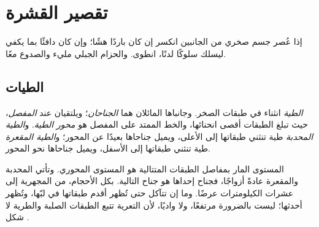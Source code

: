 \section{تقصير القشرة}

إذا عُصر جسم صخري من الجانبين انكسر إن كان باردًا هشًا؛ وإن
كان دافئًا بما يكفي ليسلك سلوكًا لدنًا، انطوى. والحزام الجبلي
مليء  والصدوع معًا.

\subsection{الطيات}

\begin{definition}\label{def:g12:mountain-building:fold}
\emph{الطية} انثناء في طبقات الصخر. وجانباها المائلان
هما \emph{الجناحان}؛ ويلتقيان عند \emph{المفصل}، حيث تبلغ الطبقات أقصى
انحنائها، والخط الممتد على المفصل هو
\emph{محور الطية}. و\emph{الطية المحدبة} طية تنثني طبقاتها
إلى الأعلى، ويميل جناحاها بعيدًا عن المحور؛
و\emph{الطية المقعرة} طية تنثني طبقاتها إلى الأسفل، ويميل
جناحاها نحو المحور.
\end{definition}

المستوى المار بمفاصل الطبقات المتتالية هو المستوى المحوري.
وتأتي  المحدبة والمقعرة عادةً أزواجًا، فجناح إحداها هو
جناح التالية.  بكل الأحجام، من المجهرية إلى عشرات
الكيلومترات عرضًا. وما إن تتآكل  حتى تُظهر أقدم طبقاتها في
لبّها، وتُظهر  أحدثها؛  ليست بالضرورة
مرتفعًا، ولا  واديًا، لأن التعرية تتبع الطبقات الصلبة
والطرية لا شكل .

